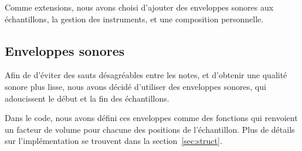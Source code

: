 \documentclass[a4paper,12pt]{article}
\begin{document}
Comme extensions, nous avons choisi d'ajouter des enveloppes sonores
aux échantillons, la gestion des instruments, et une composition personnelle.

\subsection{Enveloppes sonores}
\label{sec:enveloppes}
Afin de d'éviter des sauts désagréables entre les notes,
et d'obtenir une qualité sonore plus lisse,
nous avons décidé d'utiliser des enveloppes sonores,
qui adoucissent le début et la fin des échantillons.

Dans le code, nous avons défini ces enveloppes comme des fonctions
qui renvoient un facteur de volume pour chacune des positions
de l'échantillon.
Plus de détails sur l'implémentation se trouvent
dans la section~\ref{sec:struct}.
\end{document}
